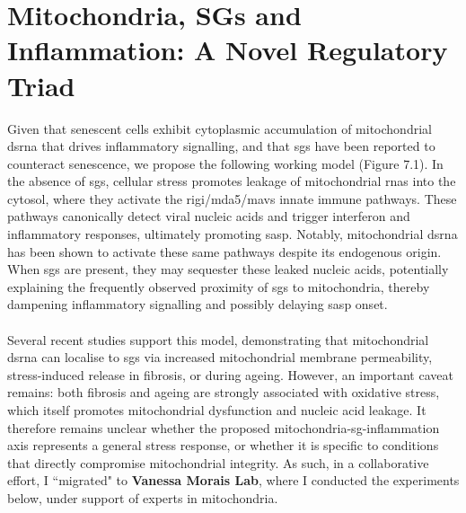 \chapter{Mitochondria, SGs and Inflammation: A Novel Regulatory Triad}
\label{chap:ChapterVI}
Given that senescent cells exhibit cytoplasmic accumulation of mitochondrial \gls{dsrna} that drives inflammatory signalling\cite{lopez-polo_release_2024}, and that \gls{sg}s have been reported to counteract senescence\cite{omer_stress_2018}, we propose the following working model (Figure 7.1). In the absence of \glspl{sg}, cellular stress promotes leakage of mitochondrial \glspl{rna} into the cytosol, where they activate the  \gls{rigi}/\gls{mda5}/\gls{mavs} innate immune pathways\cite{lopez-polo_release_2024}. These pathways canonically detect viral nucleic acids and trigger interferon and inflammatory responses, ultimately promoting \gls{sasp}\cite{dhir_mitochondrial_2018}. Notably, mitochondrial \gls{dsrna} has been shown to activate these same pathways despite its endogenous origin\cite{dhir_mitochondrial_2018}. When \glspl{sg} are present, they may sequester these leaked nucleic acids, potentially explaining the frequently observed proximity of \glspl{sg} to mitochondria\cite{amen_stress_2021, fung_production_2013}, thereby dampening inflammatory signalling and possibly delaying \gls{sasp} onset.
\\
\\
Several recent studies support this model, demonstrating that mitochondrial \gls{dsrna} can localise to \glspl{sg} via increased mitochondrial membrane permeability\cite{krieger_trafficking_2024}, stress-induced release in fibrosis\cite{travers_mitochondria-derived_2025}, or during ageing\cite{rhine_rna_2025}. However, an important caveat remains: both fibrosis and ageing are strongly associated with oxidative stress\cite{antar_fibrosis_2023, liguori_oxidative_2018}, which itself promotes mitochondrial dysfunction and nucleic acid leakage\cite{xu_mitochondria_2025}. It therefore remains unclear whether the proposed mitochondria-\gls{sg}-inflammation axis represents a general stress response, or whether it is specific to conditions that directly compromise mitochondrial integrity. As such, in a collaborative effort, I ``migrated" to \textbf{Vanessa Morais Lab}, where I conducted the experiments below, under support of experts in mitochondria.

